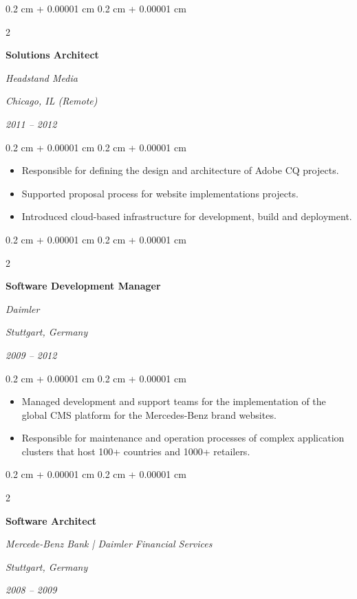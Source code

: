 \documentclass[10pt, a4paper]{article}
\newenvironment{highlights}{
    \begin{itemize}[
        topsep=0.10 cm,
        parsep=0.10 cm,
        partopsep=0pt,
        itemsep=0pt,
        leftmargin=0.4 cm + 10pt
    ]
}{
    \end{itemize}
} %
\newenvironment{onecolentry}{
    \begin{adjustwidth}{
        0.2 cm + 0.00001 cm
    }{
        0.2 cm + 0.00001 cm
    }
}{
    \end{adjustwidth}
} %
\newenvironment{twocolentry}[2][]{
    \onecolentry
    \def\secondColumn{#2}
    \setcolumnwidth{\fill, 8 cm}
    \begin{paracol}{2}
}{
    \switchcolumn \raggedleft \secondColumn
    \end{paracol}
    \endonecolentry
} %
\begin{document}
%
%
\begin{twocolentry}{
        \textit{Chicago, IL (Remote)}

        \textit{2011 – 2012}}
    \textbf{Solutions Architect}

    \textit{Headstand Media}
\end{twocolentry}

\vspace{0.10 cm}
\begin{onecolentry}
    \begin{highlights}
        \item Responsible for defining the design and architecture of Adobe CQ projects.
        \item Supported proposal process for website implementations projects.
        \item Introduced cloud-based infrastructure for development, build and deployment.
    \end{highlights}
\end{onecolentry}

\vspace{0.20 cm}



%
%
\begin{twocolentry}{
        \textit{Stuttgart, Germany}

        \textit{2009 – 2012}}
    \textbf{Software Development Manager}

    \textit{Daimler}
\end{twocolentry}

\vspace{0.10 cm}
\begin{onecolentry}
    \begin{highlights}
        \item Managed development and support teams for the implementation of the global CMS platform for the Mercedes-Benz brand websites.
        \item Responsible for maintenance and operation processes of complex application clusters that host 100+ countries and 1000+ retailers.
    \end{highlights}
\end{onecolentry}

\vspace{0.20 cm}



%
%
\begin{twocolentry}{
        \textit{Stuttgart, Germany}

        \textit{2008 – 2009}}
    \textbf{Software Architect}

    \textit{Mercede-Benz Bank | Daimler Financial Services}
\end{twocolentry}
\end{document}
